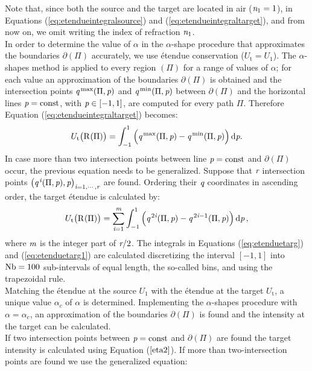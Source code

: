 Note that, since both the source and the target are located in air ($\textit{n}_1=1$), in Equations (\ref{eq:etendueintegralsource}) and (\ref{eq:etendueintegraltarget}), and from now on, we omit writing the index of refraction $\textit{n}_1$.
\\ \indent In order to determine the value of $\alpha$ in the $\alpha$-shape procedure that approximates the boundaries $\partial$$(\Pi)$ accurately, we use \'{e}tendue conservation ($U_{\textrm{t}}= U_1$). The $\alpha$-shapes method is applied to every region $(\Pi)$ for a range of values of $\alpha$;
   for each value an approximation of the boundaries $\partial$$(\Pi)$ is obtained and
   the intersection points $\textit{q}^{\textrm{\,max}}(\Pi,\textit{p})$ and $\textit{q}^{\textrm{\,min}}(\Pi,\textit{p})$ between $\partial$$(\Pi)$
and the horizontal lines $\textit{p}=\textrm{const}$, with $\textit{p}\in[-1,1]$, are computed for every path $\Pi$.
Therefore Equation (\ref{eq:etendueintegraltarget}) becomes:
\begin{equation}\label{eq:etenduetarg}
 U_\textrm{t}\big(\mbox{$\textup{R}_{\textit{}}$}(\Pi)\big)= \int_{-1}^{1}{\Big(\textit{q}^{\textrm{\,max}}(\Pi,\textit{p})-\textit{q}^{\textrm{\,min}}(\Pi,\textit{p})\Big)} \,\textrm{d}\textit{p}.
\end{equation} In case more than two intersection points between line $\textit{p}=\textrm{const}$ and $\partial$$(\Pi)$ occur, the previous equation needs to be generalized. Suppose that $\textit{r}$ intersection points $\big(\textit{q}^{\,\textit{i}}(\Pi,\textit{p}), \textit{p}\big)_{\textit{i} = 1, \cdots, \textit{r}}$ are found. 
Ordering their $\textit{q}$ coordinates in ascending order, the target \'{e}tendue is calculated by:
\begin{equation}\label{eq:etenduetarg1}
 U_\textrm{t}\big(\mbox{$\textup{R}_{\textit{}}$}(\Pi)\big) = \sum_{\textit{i} = 1}^{\textit{m}}\int_{-1}^{1}
{\Big(\textit{q}^{\,2\textit{i}}(\Pi,\textit{p})}-{\textit{q}^{\,2\textit{i}-1} (\Pi, \textit{p}) \Big)}\,\textrm{d}\textit{p}\,,
\end{equation}
where $\textit{m}$ is the integer part of $\textit{r}/2$. 
The integrals in Equations (\ref{eq:etenduetarg}) and (\ref{eq:etenduetarg1}) are calculated discretizing the interval $[-1, 1]$
   into $\textrm{Nb}=100$ sub-intervals of equal length, the so-called bins, and using the trapezoidal rule.
\\ \indent Matching the \'{e}tendue at the source $U_1$ with the \'{e}tendue at the target $U_{\textrm{t}}$, a unique value $\alpha_{c}$ of $\alpha$  is determined. Implementing the $\alpha$-shapes procedure with $\alpha = \alpha_c$, an approximation of the boundaries $\partial$$(\Pi)$ is found and the intensity at the target can be calculated.\\ \indent If two intersection points between $\textit{p}=\textrm{const}$ and $\partial$$(\Pi)$ are found the target intensity is calculated using Equation ($\ref{eta2}$). If more than two-intersection points are found we use the generalized equation:
